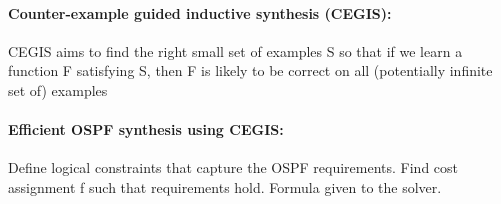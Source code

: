 \paragraph{Counter-example guided inductive synthesis (CEGIS): } CEGIS aims to find the right small set of examples S so that if we learn a function F satisfying S, then F is likely to be correct on all (potentially infinite set of) examples

\begin{minipage}{\linewidth}
    \centering      
    \def\svgwidth{\linewidth}
        
    \end{minipage}

\paragraph{Efficient OSPF synthesis using CEGIS: } Define logical constraints that capture the OSPF requirements. Find cost assignment f such that requirements hold. Formula given to the solver.